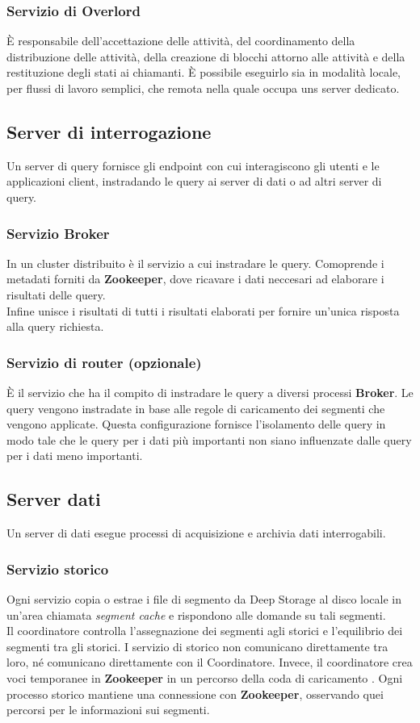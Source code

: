 \documentclass{article}
\begin{document}
\subsubsection{Servizio di Overlord}
 È responsabile dell'accettazione delle attività, del coordinamento della distribuzione delle attività, della creazione di blocchi attorno alle attività e della restituzione degli stati ai chiamanti. È possibile eseguirlo sia in modalità locale, per flussi di lavoro semplici, che remota nella quale occupa uns server dedicato.
 \subsection{Server di interrogazione}
 Un server di query fornisce gli endpoint con cui interagiscono gli utenti e le applicazioni client, instradando le query ai server di dati o ad altri server di query.
 \subsubsection{Servizio Broker}
In un cluster distribuito è il servizio a cui instradare le query. Comoprende i metadati forniti da \textbf{Zookeeper}, dove ricavare i dati neccesari ad elaborare i risultati delle query.\\
Infine unisce i risultati di tutti i risultati elaborati per fornire un'unica risposta alla query richiesta.
\subsubsection{Servizio di router (opzionale)}
 È il servizio che ha il compito di instradare le query a diversi processi \textbf{Broker}. Le query vengono instradate in base alle regole di caricamento dei segmenti che vengono applicate. Questa configurazione fornisce l'isolamento delle query in modo tale che le query per i dati più importanti non siano influenzate dalle query per i dati meno importanti.
 \subsection{Server dati}
 Un server di dati esegue processi di acquisizione e archivia dati interrogabili.
 \subsubsection{Servizio storico}
 Ogni servizio  copia o estrae i file di segmento da Deep Storage al disco locale in un'area chiamata \textit{segment cache} e rispondono alle domande su tali segmenti.\\Il coordinatore controlla l'assegnazione dei segmenti agli storici e l'equilibrio dei segmenti tra gli storici.  I servizio di storico non comunicano direttamente tra loro, né comunicano direttamente con il Coordinatore. Invece, il coordinatore crea voci temporanee in \textbf{Zookeeper} in un percorso della coda di caricamento . Ogni processo storico mantiene una connessione con \textbf{Zookeeper}, osservando quei percorsi per le informazioni sui segmenti.
\end{document}
